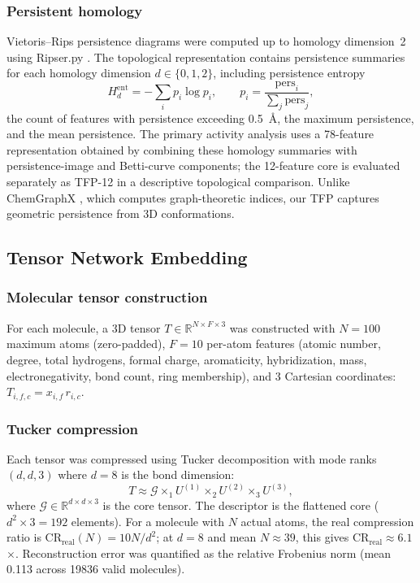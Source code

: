 \documentclass[11pt,a4paper]{article}
\begin{document}
\subsubsection{Persistent homology}

Vietoris--Rips persistence diagrams were computed up to homology dimension~2 using Ripser.py \citep{ripser_2019}. The topological representation contains persistence summaries for each homology dimension $d \in \{0, 1, 2\}$, including persistence entropy
\begin{equation}
H_d^{\mathrm{ent}} = -\sum_i p_i \log p_i, \qquad p_i = \frac{\mathrm{pers}_i}{\sum_j \mathrm{pers}_j},
\end{equation}
the count of features with persistence exceeding \SI{0.5}{\angstrom}, the maximum persistence, and the mean persistence. The primary activity analysis uses a 78-feature representation obtained by combining these homology summaries with persistence-image and Betti-curve components; the 12-feature core is evaluated separately as TFP-12 in a descriptive topological comparison. Unlike ChemGraphX \citep{chemgraphx_2026}, which computes graph-theoretic indices, our TFP captures geometric persistence from 3D conformations.

\subsection{Tensor Network Embedding}

\subsubsection{Molecular tensor construction}

For each molecule, a 3D tensor $T \in \mathbb{R}^{N \times F \times 3}$ was constructed with $N = 100$ maximum atoms (zero-padded), $F = 10$ per-atom features (atomic number, degree, total hydrogens, formal charge, aromaticity, hybridization, mass, electronegativity, bond count, ring membership), and 3 Cartesian coordinates: $T_{i,f,c} = x_{i,f} \, r_{i,c}$.

\subsubsection{Tucker compression}

Each tensor was compressed using Tucker decomposition \citep{tensorly_2019} with mode ranks $(d, d, 3)$ where $d = 8$ is the bond dimension:
\begin{equation}
T \approx \mathcal{G} \times_1 U^{(1)} \times_2 U^{(2)} \times_3 U^{(3)},
\end{equation}
where $\mathcal{G} \in \mathbb{R}^{d \times d \times 3}$ is the core tensor. The descriptor is the flattened core ($d^2 \times 3 = 192$ elements). For a molecule with $N$ actual atoms, the real compression ratio is $\mathrm{CR}_{\text{real}}(N) = 10N / d^2$; at $d = 8$ and mean $N \approx 39$, this gives $\mathrm{CR}_{\text{real}} \approx \num{6.1}$$\times$. Reconstruction error was quantified as the relative Frobenius norm (mean \num{0.113} across \num{19836} valid molecules).
\end{document}
